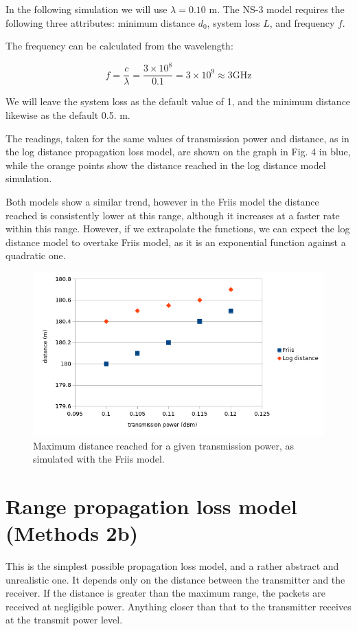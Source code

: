 \documentclass[11pt,journal]{article}
\begin{document}
	In the following simulation we will use $\lambda = 0.10$ m. The NS-3 model requires the following three attributes: minimum distance $d_0$, system loss $L$, and frequency $f$.
	
	The frequency can be calculated from the wavelength:
	
	\[ f = \dfrac{c}{\lambda} =  \dfrac{3\times 10^8}{0.1}= 3 \times 10^9 \approx 3 \text{GHz} \]
	
	We will leave the system loss as the default value of 1, and the minimum distance likewise as the default 0.5. m.
	
	The readings, taken for the same values of transmission power and distance, as in the log distance propagation loss model, are shown on the graph in Fig. 4 in blue, while the orange points show the distance reached in the log distance model simulation.
	
	Both models show a similar trend, however in the Friis model the distance reached is consistently lower at this range, although it increases at a faster rate within this range. However, if we extrapolate the functions, we can expect the log distance model to overtake Friis model, as it is an exponential function against a quadratic one.
	
	\begin{figure}[h]
		\centering
		\includegraphics[scale=0.6]{graph_friis2.png}
		\caption{Maximum distance reached for a given transmission power, as simulated with the Friis model.}
	\end{figure}
	
	\section{Range propagation loss model\cite{range doc} (Methods 2b)}
	This is the simplest possible propagation loss model, and a rather abstract and unrealistic one. It depends only on the distance between the transmitter and the receiver. If the distance is greater than the maximum range, the packets are received at negligible power. Anything closer than that to the transmitter receives at the transmit power level.
	
\end{document}
